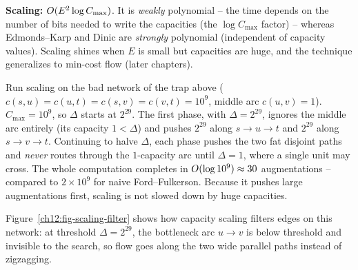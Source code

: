 \begin{complexitybox}
\textbf{Scaling:} $O(E^2\log C_{\max})$. It is \emph{weakly} polynomial -- the
time depends on the number of bits needed to write the capacities (the $\log C_{\max}$ factor) -- whereas Edmonds--Karp and Dinic
are \emph{strongly} polynomial (independent of capacity values). Scaling shines when $E$ is small but capacities
are huge, and the technique generalizes to min-cost flow (later chapters).
\end{complexitybox}

\begin{labbox}
Run scaling on the bad network of the trap above ($c(s,u)=c(u,t)=c(s,v)=c(v,t)=
10^9$, middle arc $c(u,v)=1$). $C_{\max}=10^9$, so $\Delta$ starts at $2^{29}$. The
first phase, with $\Delta=2^{29}$, ignores the middle arc entirely (its capacity
$1<\Delta$) and pushes $2^{29}$ along $s\to u\to t$ and $2^{29}$ along
$s\to v\to t$. Continuing to halve $\Delta$, each phase pushes the two fat disjoint
paths and \emph{never} routes through the $1$-capacity arc until $\Delta=1$, where
a single unit may cross. The whole computation completes in $O(\log 10^9)\approx 30$
augmentations -- compared to $2\times 10^9$ for naive Ford--Fulkerson. Because it
pushes large augmentations first, scaling is not slowed down by huge capacities.
\end{labbox}

Figure~\ref{ch12:fig-scaling-filter} shows how capacity scaling filters edges on this network: at threshold $\Delta=2^{29}$, the bottleneck arc $u\to v$ is below threshold and invisible to the search, so flow goes along the two wide parallel paths instead of zigzagging.

